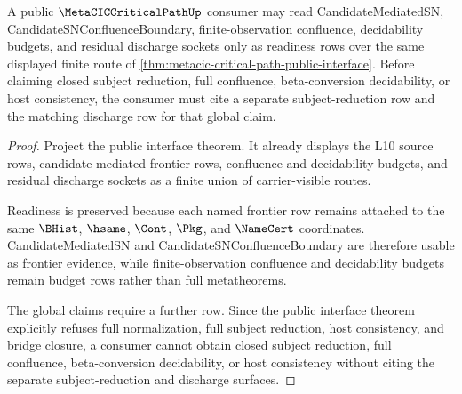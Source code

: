 \begin{theorem}
\label{thm:metacic-critical-path-public-interface-frontier-readiness}
A public $\MetaCICCriticalPathUp$ consumer may read CandidateMediatedSN, CandidateSNConfluenceBoundary, finite-observation confluence, decidability budgets, and residual discharge sockets only as readiness rows over the same displayed finite route of \autoref{thm:metacic-critical-path-public-interface}. Before claiming closed subject reduction, full confluence, beta-conversion decidability, or host consistency, the consumer must cite a separate subject-reduction row and the matching discharge row for that global claim.
\end{theorem}
\begin{proof}
Project the public interface theorem. It already displays the L10 source rows, candidate-mediated frontier rows, confluence and decidability budgets, and residual discharge sockets as a finite union of carrier-visible routes.

Readiness is preserved because each named frontier row remains attached to the same $\BHist$, $\hsame$, $\Cont$, $\Pkg$, and $\NameCert$ coordinates. CandidateMediatedSN and CandidateSNConfluenceBoundary are therefore usable as frontier evidence, while finite-observation confluence and decidability budgets remain budget rows rather than full metatheorems.

The global claims require a further row. Since the public interface theorem explicitly refuses full normalization, full subject reduction, host consistency, and bridge closure, a consumer cannot obtain closed subject reduction, full confluence, beta-conversion decidability, or host consistency without citing the separate subject-reduction and discharge surfaces.
\end{proof}

